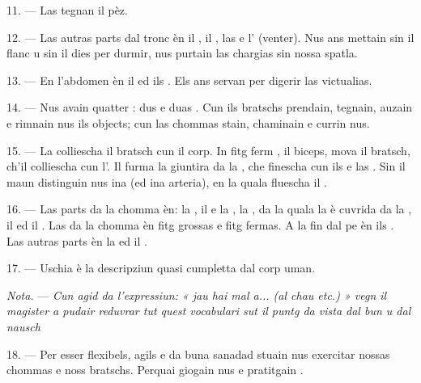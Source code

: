 11. --- Las  tegnan il pèz.

12. --- Las autras parts dal tronc èn il , il , las
 e l' (venter). Nus ans mettain sin il flanc u sin
il dies per durmir, nus purtain las chargias sin nossa spatla.

13. --- En l'abdomen èn il  ed ils . Els ans
servan per digerir las victualias.

\VUsaut{4.4mm}
\VUsaut{3.0mm}

14. --- Nus avain quatter : dus  e duas
. Cun ils bratschs prendain, tegnain, auzain e rimnain nus ils
objects; cun las chommas stain, chaminain e currin nus.

15. --- La  colliescha il bratsch cun il corp. In fitg ferm
, il biceps, mova il bratsch, ch'il  colliescha cun
l'. Il  furma la giuntira da la ,
che finescha cun ils  e las . Sin il maun distinguin
nus ina  (ed ina arteria), en la quala fluescha il .

16. --- Las parts da la chomma èn: la , il  e la
, la , da la quala la  è
cuvrida da la , il  ed il . Las
 da la chomma èn fitg grossas e fitg fermas. A la fin dal pe èn ils
. Las autras parts èn la  ed il
.

17. --- Uschia è la descripziun quasi cumpletta dal corp uman.

\textit{Nota.} --- \textit{Cun agid da l'expressiun: « jau hai mal a... (al chau
etc.) » vegn il magister a pudair reduvrar tut quest vocabulari sut il puntg da
vista dal bun u dal nausch} 

\VUsaut{5.0mm}
\VUsaut{2.4mm}
\VUsaut{3.0mm}

18. --- Per esser flexibels, agils e da buna sanadad stuain nus exercitar nossas
chommas e noss bratschs. Perquai giogain nus e pratitgain .


